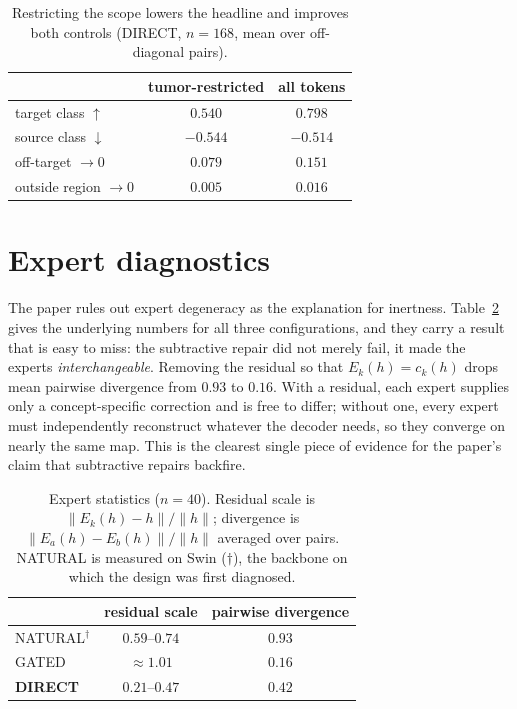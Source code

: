\documentclass[10pt,twocolumn,letterpaper]{article}
\begin{document}
\begin{table}[t]\centering\footnotesize
\setlength{\tabcolsep}{4pt}
\caption{Restricting the scope lowers the headline and improves both controls (DIRECT,
$n{=}168$, mean over off-diagonal pairs).}
\label{tab:scope}
\begin{tabular}{lcc}
\toprule
& tumor-restricted & all tokens \\
\midrule
target class $\uparrow$    & $\mathbf{0.540}$ & $0.798$ \\
source class $\downarrow$  & $-0.544$ & $-0.514$ \\
off-target $\to 0$         & $\mathbf{0.079}$ & $0.151$ \\
outside region $\to 0$     & $\mathbf{0.005}$ & $0.016$ \\
\bottomrule
\end{tabular}
\end{table}

\section{Expert diagnostics}
\label{sec:experts}

The paper rules out expert degeneracy as the explanation for inertness.
Table~\ref{tab:experts} gives the underlying numbers for all three configurations, and they
carry a result that is easy to miss: the subtractive repair did not merely fail, it made the
experts \emph{interchangeable}. Removing the residual so that $E_k(h)=c_k(h)$ drops mean
pairwise divergence from $0.93$ to $0.16$. With a residual, each expert supplies only a
concept-specific correction and is free to differ; without one, every expert must
independently reconstruct whatever the decoder needs, so they converge on nearly the same
map. This is the clearest single piece of evidence for the paper's claim that subtractive
repairs backfire.

\begin{table}[t]\centering\footnotesize
\setlength{\tabcolsep}{4pt}
\caption{Expert statistics ($n{=}40$). Residual scale is
$\lVert E_k(h)-h\rVert/\lVert h\rVert$; divergence is
$\lVert E_a(h)-E_b(h)\rVert/\lVert h\rVert$ averaged over pairs. NATURAL is measured on Swin
($\dagger$), the backbone on which the design was first diagnosed.}
\label{tab:experts}
\begin{tabular}{lcc}
\toprule
& residual scale & pairwise divergence \\
\midrule
NATURAL$^\dagger$ & $0.59$--$0.74$ & $0.93$ \\
GATED             & ${\approx}1.01$ & $0.16$ \\
\textbf{DIRECT}   & $0.21$--$0.47$ & $0.42$ \\
\bottomrule
\end{tabular}
\end{table}
\end{document}
